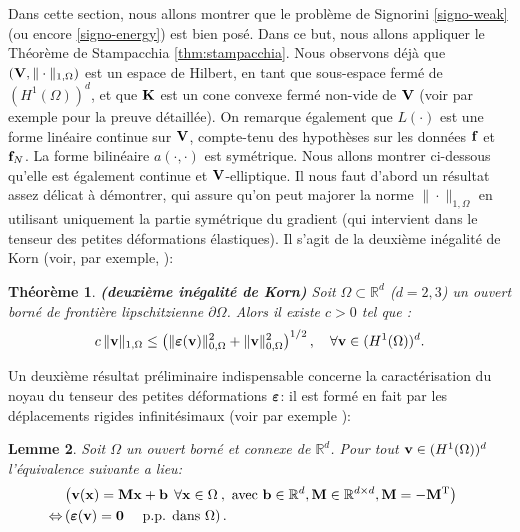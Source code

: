 \documentclass[11pt]{book}
\newtheorem{theorem}{Théorème}[section]
\newtheorem{lemma}[theorem]{Lemme}
\newcommand{\be}{\begin{equation}}
\newcommand{\ee}{\end{equation}}
\newcommand{\beqs}{\begin{eqnarray*}}
\newcommand{\eeqs}{\end{eqnarray*}}
\newcommand{\bt}{\begin{theorem}}
\newcommand{\et}{\end{theorem}}
\newcommand{\bl}{\begin{lemma}}
\newcommand{\el}{\end{lemma}}
\def\u{{\bf u}}
\def\f{{\bf f}}
\def\vv{{\bf v}}
\def\x{{\bf x}}
\def\F{{\bf F}}
\def\V{{\bf V}}
\def\K{{\bf K}}
\def\0{{\bf 0}}
\newcommand{\R}{\mathbb{R}}
\newcommand{\e}{\mbox{\boldmath{$\varepsilon$}}}
\begin{document}
Dans cette section, nous allons montrer que le problème de Signorini \eqref{signo-weak} (ou encore \eqref{signo-energy}) est bien posé.
% 
Dans ce but, nous allons appliquer le Théorème de Stampacchia \ref{thm:stampacchia}. 
Nous observons déjà que $(\V , \| \cdot \|_{1,\Omega})$ est un espace de Hilbert, en tant que sous-espace fermé de $(H^1(\Omega))^d$, et que $\K$ est un cone convexe fermé non-vide de $\V$ (voir par exemple \cite[Chapter 5]{kikuchi-oden-88} pour la preuve détaillée). 
On remarque également que $L(\cdot)$ est une forme linéaire continue sur $\V$, compte-tenu des hypothèses sur les données $\f$ et $\f_N$. %
La forme bilinéaire $a(\cdot,\cdot)$ est symétrique. Nous allons montrer ci-dessous qu'elle est également continue et $\V$-elliptique. 
Il nous faut d'abord un résultat assez délicat à démontrer, qui assure qu'on peut majorer la norme $\| \cdot \|_{1,\Omega}$ en utilisant uniquement la partie symétrique du gradient (qui intervient dans le tenseur des petites déformations élastiques). Il s'agit de la deuxième inégalité de Korn (voir, par exemple, \cite[Theorem 5.13]{kikuchi-oden-88}):

\bt
\label{thm:korn2} {\bf (deuxième inégalité de Korn)}
Soit $\Omega \subset \R^d$ ($d=2,3$)
un ouvert borné de frontière lipschitzienne 
 $\partial \Omega$. %
Alors il existe $c > 0$ tel que :
 \be
 \label{eq:korn2}
 c \, \| \vv \|_{1,\Omega} \leq \left ( \| \e(\vv) \|^2_{0,\Omega} + \| \vv \|^2_{0,\Omega} \right )^{1/2},
 \quad
 \forall \vv \in (H^1(\Omega))^d.
 \ee
\et


% 
% 
Un deuxième résultat préliminaire indispensable concerne la caractérisation du noyau du tenseur des petites déformations $\e$: il est formé en fait par les déplacements rigides infinitésimaux 
(voir par exemple \cite[Lemma 6.1, p.113]{kikuchi-oden-88}):
\bl
\label{lemme:rigid}
Soit $\Omega$ un ouvert borné et connexe de $\R^d$. %
% 
Pour tout $\vv \in (H^1(\Omega))^d$ l'équivalence suivante a lieu:
 \beqs
 & \left ( \vv(\x) = \mathbf{M} \x + \mathbf{b} \:\: \forall \x\in\Omega \:, \textrm{ avec } 
 \mathbf{b} \in \R^d , \mathbf{M} \in \R^{d\times d}, \mathbf{M} = -\mathbf{M}^{\mathrm{T}} \right)&\\
 \Leftrightarrow&
 \left ( \e(\vv) = \0 \quad \textrm{ p.p. dans } \Omega \right).&
 \eeqs
\el
 
\end{document}
